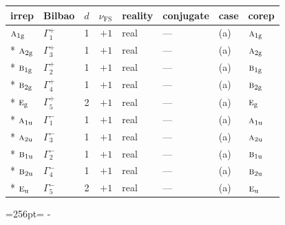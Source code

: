 \documentclass[10pt,a4paper]{article}
\newcommand{\needspace}[1]{\par\penalty-100\begingroup\dimen0=#1\relax\dimen2=\pagegoal
  \advance\dimen2-\pagetotal\ifdim\dimen0>\dimen2\relax\ifdim\dimen2>0pt\vfil\break\fi\fi
  \endgroup}
\numberwithin{equation}{section}
\newcommand{\irr}[1]{\text{\normalfont\scshape #1}}
\newcommand{\ptag}[1]{\mathrm{#1}}
\newcommand{\fsind}{\nu_{\mathrm{FS}}}
\begin{document}
{\small\renewcommand{\arraystretch}{1.25}\setlength{\tabcolsep}{4pt}\begin{longtable}{@{}llrrllll@{}}\toprule
irrep & Bilbao & $d$ & $\fsind$ & reality & conjugate & case & corep\\\midrule\endhead
\bottomrule\endfoot\endlastfoot
$\irr{a}_{1\ptag{g}}$ & $\Gamma_{1}^{+}$ & 1 & $+1$ & real & --- & (a) & $\irr{a}_{1\ptag{g}}$\\*
$\irr{a}_{2\ptag{g}}$ & $\Gamma_{3}^{+}$ & 1 & $+1$ & real & --- & (a) & $\irr{a}_{2\ptag{g}}$\\*
$\irr{b}_{1\ptag{g}}$ & $\Gamma_{2}^{+}$ & 1 & $+1$ & real & --- & (a) & $\irr{b}_{1\ptag{g}}$\\*
$\irr{b}_{2\ptag{g}}$ & $\Gamma_{4}^{+}$ & 1 & $+1$ & real & --- & (a) & $\irr{b}_{2\ptag{g}}$\\*
$\irr{e}_{\ptag{g}}$ & $\Gamma_{5}^{+}$ & 2 & $+1$ & real & --- & (a) & $\irr{e}_{\ptag{g}}$\\*
$\irr{a}_{1\ptag{u}}$ & $\Gamma_{1}^{-}$ & 1 & $+1$ & real & --- & (a) & $\irr{a}_{1\ptag{u}}$\\*
$\irr{a}_{2\ptag{u}}$ & $\Gamma_{3}^{-}$ & 1 & $+1$ & real & --- & (a) & $\irr{a}_{2\ptag{u}}$\\*
$\irr{b}_{1\ptag{u}}$ & $\Gamma_{2}^{-}$ & 1 & $+1$ & real & --- & (a) & $\irr{b}_{1\ptag{u}}$\\*
$\irr{b}_{2\ptag{u}}$ & $\Gamma_{4}^{-}$ & 1 & $+1$ & real & --- & (a) & $\irr{b}_{2\ptag{u}}$\\*
$\irr{e}_{\ptag{u}}$ & $\Gamma_{5}^{-}$ & 2 & $+1$ & real & --- & (a) & $\irr{e}_{\ptag{u}}$\\
\bottomrule\end{longtable}}
\needspace{256pt}
\end{document}
